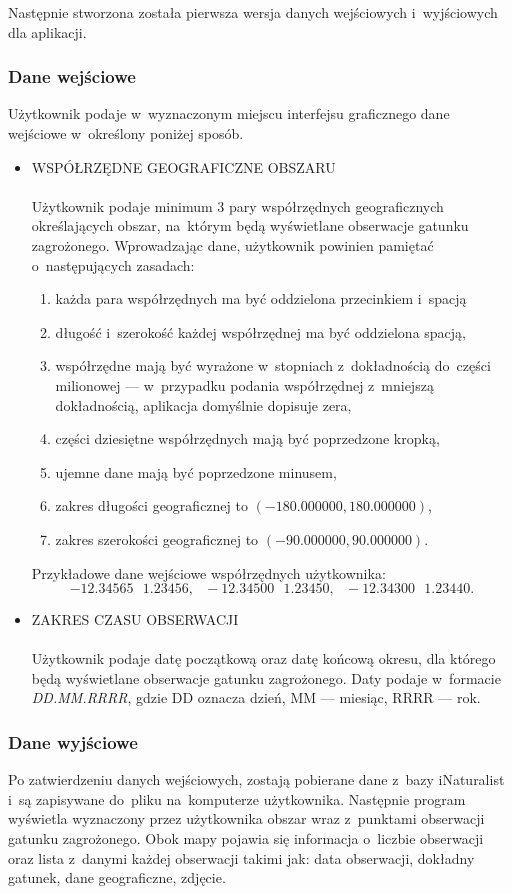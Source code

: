 \documentclass{article}
\begin{document}
Następnie stworzona została pierwsza wersja danych wejściowych i~wyjściowych dla aplikacji.
  \subsubsection{Dane wejściowe}
 Użytkownik podaje w~wyznaczonym miejscu interfejsu graficznego dane wejściowe w~określony poniżej sposób.
 \begin{itemize}
     \item WSPÓŁRZĘDNE GEOGRAFICZNE OBSZARU\\\\ Użytkownik podaje minimum 3 pary współrzędnych geograficznych określających obszar, na~którym będą wyświetlane obserwacje gatunku zagrożonego. Wprowadzając dane, użytkownik powinien pamiętać o~następujących zasadach:
 \begin{enumerate}
     \item każda para współrzędnych ma być oddzielona przecinkiem i~spacją
     \item długość i~szerokość każdej współrzędnej ma być oddzielona spacją, 
     \item współrzędne mają być wyrażone w~stopniach z~dokładnością do~części milionowej --- w~przypadku podania współrzędnej z~mniejszą dokładnością, aplikacja domyślnie dopisuje zera,
     \item części dziesiętne współrzędnych mają być poprzedzone kropką,
     \item ujemne dane mają być poprzedzone minusem,
     \item zakres długości geograficznej to $(-180.000000, 180.000000)$, 
     \item zakres szerokości geograficznej to $(-90.000000, 90.000000)$.

 \end{enumerate} Przykładowe dane wejściowe współrzędnych użytkownika: 
 $$-12.34565\textit{ } 1.23456,\textit{ }-12.34500\textit{ } 1.23450,\textit{ } -12.34300\textit{ } 1.23440.$$
 \item ZAKRES CZASU OBSERWACJI\\\\ Użytkownik podaje datę początkową oraz datę końcową okresu, dla którego będą wyświetlane obserwacje gatunku zagrożonego. Daty podaje w~formacie \textit{DD.MM.RRRR}, gdzie DD oznacza dzień, MM --- miesiąc, RRRR --- rok.

 \end{itemize}

 \subsubsection{Dane wyjściowe}
 Po zatwierdzeniu danych wejściowych, zostają pobierane dane z~bazy iNaturalist i~są zapisywane do~pliku na~komputerze użytkownika. Następnie program wyświetla wyznaczony przez użytkownika obszar wraz z~punktami obserwacji gatunku zagrożonego. Obok mapy pojawia się informacja o~liczbie obserwacji oraz lista z~danymi każdej obserwacji takimi jak: data obserwacji, dokładny gatunek, dane geograficzne, zdjęcie.
 
\end{document}
